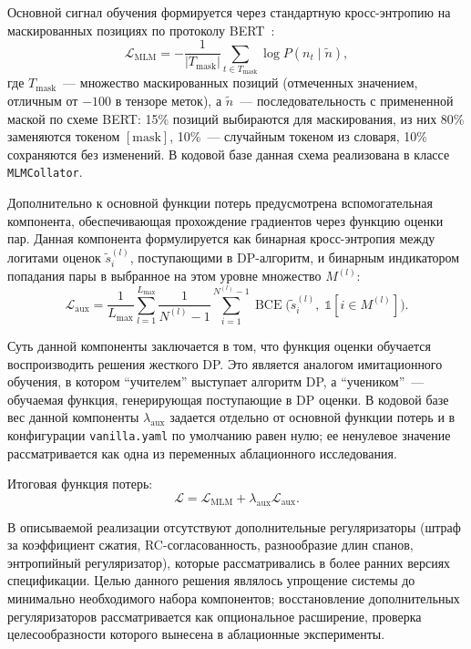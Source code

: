 Основной сигнал обучения формируется через стандартную кросс-энтропию
на маскированных позициях по протоколу
BERT~\cite{devlinBERTPretrainingDeep2019}:
\begin{equation}
  \mathcal L_{\text{MLM}} = -\frac{1}{|T_{\text{mask}}|}
  \sum_{t \in T_{\text{mask}}} \log P(n_t \mid \tilde n),
  \label{eq:mlm_loss}
\end{equation}
где $T_{\text{mask}}$~--- множество маскированных позиций (отмеченных
значением, отличным от $-100$ в тензоре меток), а $\tilde n$~---
последовательность с примененной маской по схеме BERT: 15\% позиций
выбираются для маскирования, из них 80\% заменяются токеном
$[\text{mask}]$, 10\%~--- случайным токеном из словаря, 10\%
сохраняются без изменений. В кодовой базе данная схема реализована в
классе \texttt{MLMCollator}.

Дополнительно к основной функции потерь предусмотрена вспомогательная
компонента, обеспечивающая прохождение градиентов через функцию оценки
пар. Данная компонента формулируется как бинарная кросс-энтропия между
логитами оценок $\tilde s_i^{(l)}$, поступающими в DP-алгоритм, и
бинарным индикатором попадания пары в выбранное на этом уровне
множество $M^{(l)}$:
\begin{equation}
  \mathcal L_{\text{aux}} = \frac{1}{L_{\max}}
  \sum_{l=1}^{L_{\max}} \frac{1}{N^{(l)} - 1}
  \sum_{i=1}^{N^{(l)} - 1} \operatorname{BCE}\!\big(\tilde s_i^{(l)},\;
  \mathbb{1}[i \in M^{(l)}]\big).
  \label{eq:aux_loss}
\end{equation}

Суть данной компоненты заключается в том, что функция оценки
обучается воспроизводить решения жесткого DP. Это является аналогом
имитационного обучения, в котором ``учителем'' выступает алгоритм
DP, а ``учеником''~--- обучаемая функция, генерирующая поступающие в
DP оценки. В кодовой базе вес данной компоненты $\lambda_{\text{aux}}$
задается отдельно от основной функции потерь и в конфигурации
\texttt{vanilla.yaml} по умолчанию равен нулю; ее ненулевое значение
рассматривается как одна из переменных аблационного исследования.

Итоговая функция потерь:
\begin{equation}
  \mathcal L = \mathcal L_{\text{MLM}} + \lambda_{\text{aux}} \mathcal L_{\text{aux}}.
  \label{eq:total_loss}
\end{equation}

В описываемой реализации отсутствуют дополнительные регуляризаторы
(штраф за коэффициент сжатия, RC-согласованность, разнообразие длин
спанов, энтропийный регуляризатор), которые рассматривались в более
ранних версиях спецификации. Целью данного решения являлось упрощение
системы до минимально необходимого набора компонентов; восстановление
дополнительных регуляризаторов рассматривается как опциональное
расширение, проверка целесообразности которого вынесена в аблационные
эксперименты.

